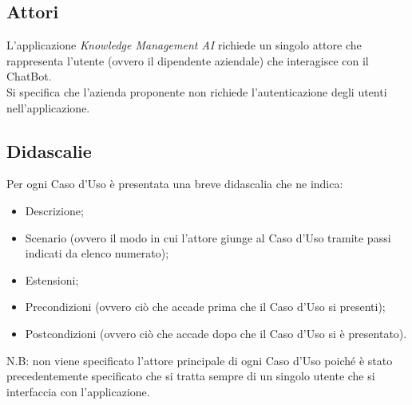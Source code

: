 \documentclass[10pt, a4paper]{article}
\begin{document}
\subsection{Attori}
L'applicazione \textit{Knowledge Management AI} richiede un singolo attore che rappresenta l'utente (ovvero il dipendente aziendale) che interagisce con il ChatBot. \\ Si specifica che l'azienda proponente non richiede l'autenticazione degli utenti nell'applicazione.%
\subsection{Didascalie}
Per ogni Caso d'Uso è presentata una breve didascalia che ne indica:
\begin{itemize}
    \item Descrizione;
    \item Scenario (ovvero il modo in cui l'attore giunge al Caso d'Uso tramite passi indicati da elenco numerato);
    \item Estensioni;
    \item Precondizioni (ovvero ciò che accade prima che il Caso d'Uso si presenti);
    \item Postcondizioni (ovvero ciò che accade dopo che il Caso d'Uso si è presentato).
\end{itemize}
N.B: non viene specificato l'attore principale di ogni Caso d'Uso poiché è stato precedentemente specificato che si tratta sempre di un singolo utente che si interfaccia con l'applicazione.
\end{document}
